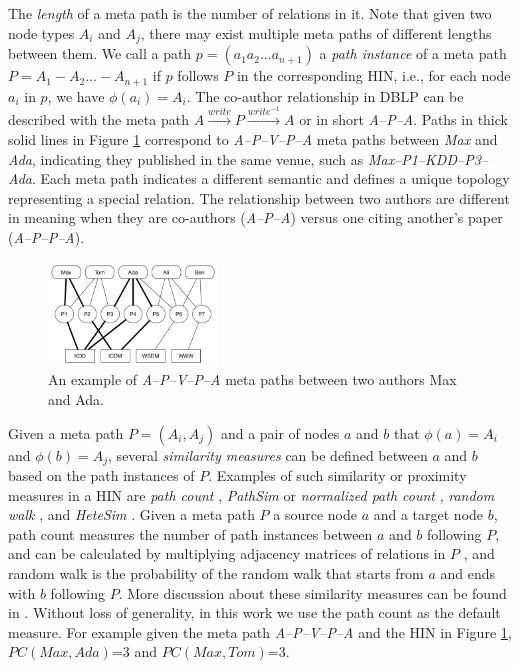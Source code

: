 The \textit{length} of a meta path is the number of relations in it. Note that given two node types $A_i$ and $A_j$, there may exist multiple meta paths of different lengths between them. We call a path $p = (a_1a_2...a_{n+1})$ a \textit{path instance} of a meta path $P = A_1-A_2... -A_{n+1}$ if $p$ follows $P$ in the corresponding HIN, i.e., for each node $a_i$ in $p$, we have $\phi(a_i)=A_i$. The co-author relationship in DBLP can be described with the meta path $A\xrightarrow{write}P\xrightarrow{write^{-1}}A$ or in short \textit{A--P--A}. Paths in thick solid lines in Figure \ref{sampleNetwork} correspond to \textit{A--P--V--P--A} meta paths between \textit{Max} and \textit{Ada}, indicating they published in the same venue, such as \textit{Max--P1--KDD--P3--Ada}. %
Each meta path indicates a different semantic and defines a unique topology representing a special relation. The relationship between two authors are different in meaning when they are co-authors (\textit{A--P--A}) versus one citing another's paper (\textit{A--P--P--A}).

\begin{figure}[t]
  \centering
      \includegraphics[width=0.4\textwidth]{figs/exampleSocialNetwork.pdf}
  \caption{An example of \textit{A--P--V--P--A} meta paths between two authors Max and Ada.}\label{sampleNetwork}
\end{figure}

 Given a meta path $P = (A_i,A_j)$ and a pair of nodes $a$ and $b$ that $\phi(a)=A_i$ and $\phi(b)=A_{j}$, several \textit{similarity measures} can be defined between $a$ and $b$ based on the path instances of $P$. Examples of such similarity or proximity measures in a HIN are \textit{path count} \cite{sun2011pathsim,sun2011ASONAM}, \textit{PathSim} \cite{sun2011pathsim} or \textit{normalized path count} \cite{sun2011ASONAM}, \textit{random walk} \cite{sun2011ASONAM}, and \textit{HeteSim} \cite{shi2014hetesim}. Given a meta path $P$ a source node $a$ and a target node $b$, path count measures the number of path instances between $a$ and $b$ following $P$, and can be calculated by multiplying adjacency matrices of relations in $P$ \cite{sun2011ASONAM}, and random walk is the probability of the random walk that starts from $a$ and ends with $b$ following $P$. More discussion about these similarity measures can be found in \cite{shi2014hetesim,sun2011ASONAM,sun2011pathsim}. Without loss of generality, in this work we use the path count as the default measure. For example given the meta path \textit{A--P--V--P--A} and the HIN in Figure \ref{sampleNetwork}, $PC(Max,Ada)$=3 and $PC(Max,Tom)$=3. 


